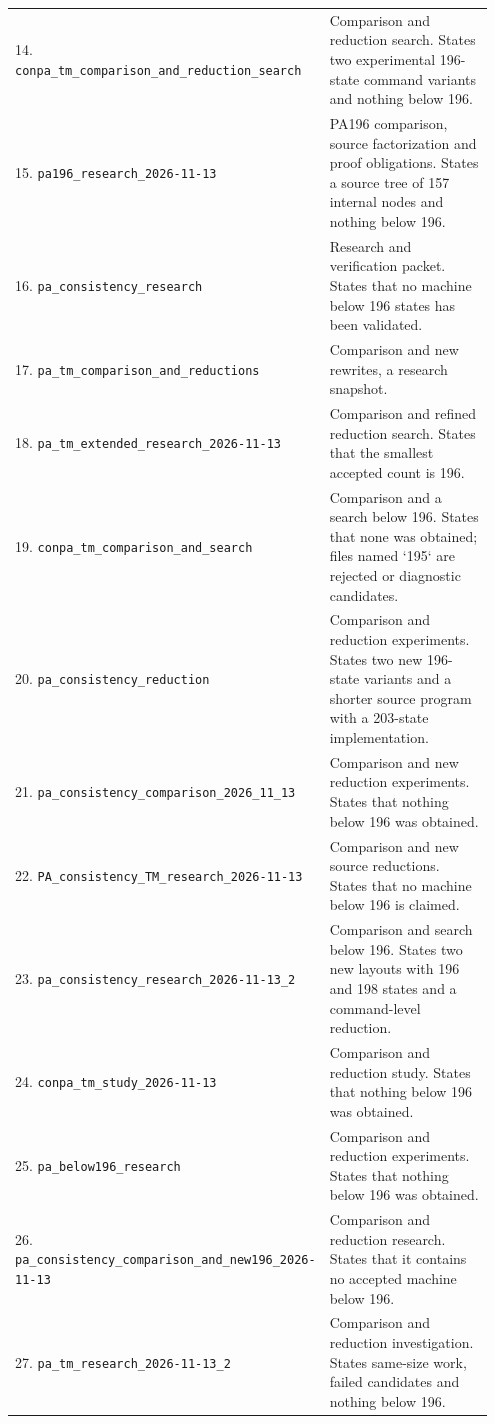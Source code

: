 \begin{longtable}{@{}p{0.37\linewidth}p{0.58\linewidth}@{}}
14. \nolinkurl{conpa_tm_comparison_and_reduction_search} & Comparison and reduction search. States two experimental 196-state command variants and nothing below 196.\\[5pt]
15. \nolinkurl{pa196_research_2026-11-13} & PA196 comparison, source factorization and proof obligations. States a source tree of 157 internal nodes and nothing below 196.\\[5pt]
16. \nolinkurl{pa_consistency_research} & Research and verification packet. States that no machine below 196 states has been validated.\\[5pt]
17. \nolinkurl{pa_tm_comparison_and_reductions} & Comparison and new rewrites, a research snapshot.\\[5pt]
18. \nolinkurl{pa_tm_extended_research_2026-11-13} & Comparison and refined reduction search. States that the smallest accepted count is 196.\\[5pt]
19. \nolinkurl{conpa_tm_comparison_and_search} & Comparison and a search below 196. States that none was obtained; files named `195` are rejected or diagnostic candidates.\\[5pt]
20. \nolinkurl{pa_consistency_reduction} & Comparison and reduction experiments. States two new 196-state variants and a shorter source program with a 203-state implementation.\\[5pt]
21. \nolinkurl{pa_consistency_comparison_2026_11_13} & Comparison and new reduction experiments. States that nothing below 196 was obtained.\\[5pt]
22. \nolinkurl{PA_consistency_TM_research_2026-11-13} & Comparison and new source reductions. States that no machine below 196 is claimed.\\[5pt]
23. \nolinkurl{pa_consistency_research_2026-11-13_2} & Comparison and search below 196. States two new layouts with 196 and 198 states and a command-level reduction.\\[5pt]
24. \nolinkurl{conpa_tm_study_2026-11-13} & Comparison and reduction study. States that nothing below 196 was obtained.\\[5pt]
25. \nolinkurl{pa_below196_research} & Comparison and reduction experiments. States that nothing below 196 was obtained.\\[5pt]
26. \nolinkurl{pa_consistency_comparison_and_new196_2026-11-13} & Comparison and reduction research. States that it contains no accepted machine below 196.\\[5pt]
27. \nolinkurl{pa_tm_research_2026-11-13_2} & Comparison and reduction investigation. States same-size work, failed candidates and nothing below 196.\\[5pt]

\end{longtable}
